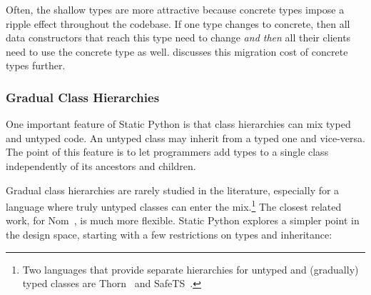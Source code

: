 \documentclass[english,cleveref,submission]{programming}
\newcommand{\SP}{Static Python}
\begin{document}
Often, the shallow types are more attractive because concrete types impose
a ripple effect throughout the codebase.
If one type changes to concrete, then all data constructors that reach this type need
to change \emph{and then} all their clients need to use the concrete type as well.
 discusses this migration cost of concrete types further.


\subsubsection{Gradual Class Hierarchies}
\label{s:inheritance}

One important feature of \SP{} is that class hierarchies can
mix typed and untyped code.
An untyped class may inherit from a typed one and vice-versa.
The point of this feature is to let programmers add types to a single class
independently of its ancestors and children.


Gradual class hierarchies are rarely studied in the literature, especially
for a language where truly untyped classes can enter the mix.\footnote{Two
languages that provide separate hierarchies for untyped and (gradually) typed
classes are Thorn~\cite{wzlov-popl-2010} and SafeTS~\cite{rsfbv-popl-2015}.}
The closest related work, for Nom~\cite{mt-oopsla-2017}, is much more flexible.
\SP{} explores a simpler point in the design space, starting with
a few restrictions on types and inheritance:
\end{document}
